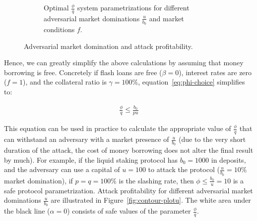 \begin{figure}[htb]
\begin{subfigure}{0.49\textwidth}
    \caption{Optimal $\frac{\phi}{q}$ system parametrizations
             for different adversarial market dominations $\frac{u}{b_0}$
             and market conditions $f$.}
    \label{fig:compare-f-plotu}
  \end{subfigure}
  \caption{Adversarial market domination and attack profitability.}
  \label{fig:plotu}
\end{figure}

Hence, we can greatly simplify the above calculations by assuming that money borrowing is free.
Concretely if flash loans are free ($\beta = 0$), interest rates are zero ($f = 1$),
and the collateral ratio is $\gamma = 100\%$, equation~\eqref{eq:phi-choice} simplifies to:

\begin{gather*}
  \frac{\phi}{q} \leq \frac{b_0}{pu} \label{eq:phi-choice-simple} \tag{$\ast$}
\end{gather*}

This equation can be used in practice to calculate the appropriate value
of $\frac{\phi}{q}$ that can withstand an adversary with a market presence of $\frac{u}{b_0}$
(due to the very short duration of the attack, the cost of money borrowing does not alter
the final result by much).
For example, if the liquid staking protocol has $b_0 = 1000$ \asset in deposits,
and the adversary can use a capital of $u = 100$ \asset to attack the protocol
($\frac{u}{b_0} = 10\%$ market domination),
if $p = q = 100\%$ is the slashing rate, then $\phi \leq \frac{b_0}{u} = 10$
is a safe protocol parametrization. Attack profitability for different adversarial
market dominations $\frac{u}{b_0}$ are illustrated in Figure~\ref{fig:contour-plotu}.
The white area under the black line ($\alpha = 0$) consists of safe values
of the parameter $\frac{\phi}{q}$.

%
%

